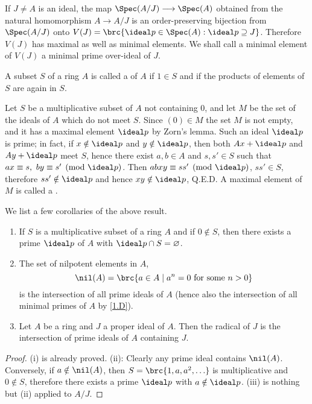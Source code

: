\documentclass[../main]{subfiles}
\begin{document}
If $J\ne A$ is an ideal, the map $\Spec(A/J)\longrightarrow\Spec(A)$ obtained from the natural homomorphism $A\longrightarrow A/J$ is an order-preserving bijection from $\Spec(A/J)$ onto $V(J)=\brc{\ideal p\in\Spec(A): \ideal p\supseteq J}$. Therefore $V(J)$ has maximal as well as minimal elements. We shall call a minimal element of $V(J)$ a minimal prime over-ideal of $J$.

\newparagraph
A subset $S$ of a ring $A$ is called a  of $A$ if $1\in S$ and if the products of elements of $S$ are again in $S$.

Let $S$ be a multiplicative subset of $A$ not containing 0, and let $M$ be the set of the ideals of $A$ which do not meet $S$. Since $(0)\in M$ the set $M$ is not empty, and it has a maximal element $\ideal p$ by Zorn's lemma. Such an ideal $\ideal p$ is prime; in fact, if $x\notin\ideal p$ and $y\notin\ideal p$, then both $Ax+\ideal p$ and $Ay+\ideal p$ meet $S$, hence there exist $a,b\in A$ and $s,s'\in S$ such that $ax\equiv s,~by\equiv s'\pmod{\ideal p}$. Then $abxy\equiv ss'\pmod{\ideal p}$, $ss'\in S$, therefore $ss'\notin\ideal p$ and hence $xy\notin\ideal p$, Q.E.D. A maximal element of $M$ is called a .

We list a few corollaries of the above result.
\begin{enumerate}[label=(\roman*)]

    \item If $S$ is a multiplicative subset of a ring $A$ and if $0\notin S$, then there exists a prime $\ideal p$ of $A$ with $\ideal p\cap S=\varnothing$.
    
    \item The set of nilpotent elements in $A$, \[\nil(A) = \brc{a\in A \mid a^n=0 \text{ for some }n>0}\] is the intersection of all prime ideals of $A$ (hence also the intersection of all minimal primes of $A$ by \ref{1.D}).
    
    \item Let $A$ be a ring and $J$ a proper ideal of $A$. Then the radical of $J$ is the intersection of prime ideals of $A$ containing $J$.
    
\end{enumerate}

\begin{proof}
(i) is already proved. (ii): Clearly any prime ideal contains $\nil(A)$. Conversely, if $a\notin\nil(A)$, then $S=\brc{1,a,a^2,\ldots}$ is multiplicative and $0\notin S$, therefore there exists a prime $\ideal p$ with $a\notin\ideal p$. (iii) is nothing but (ii) applied to $A/J$.
\end{proof}
\end{document}
